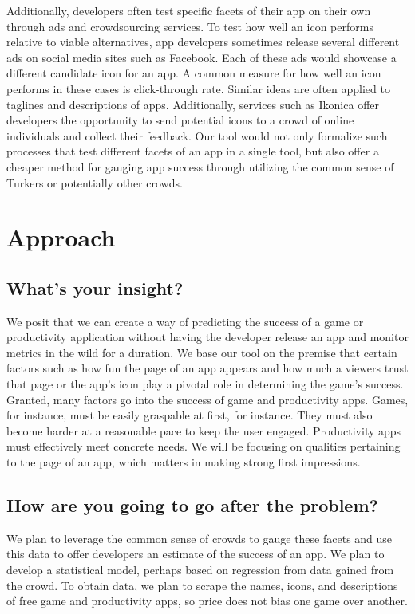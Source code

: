 \documentclass{article}
\begin{document}
Additionally, developers often test specific facets of their app on their own through ads and crowdsourcing services. To test how well an icon performs relative to viable alternatives, app developers sometimes release several different ads on social media sites such as Facebook. Each of these ads would showcase a different candidate icon for an app. A common measure for how well an icon performs in these cases is click-through rate. Similar ideas are often applied to taglines and descriptions of apps. Additionally, services such as Ikonica offer developers the opportunity to send potential icons to a crowd of online individuals and collect their feedback. Our tool would not only formalize such processes that test different facets of an app in a single tool, but also offer a cheaper method for gauging app success through utilizing the common sense of Turkers or potentially other crowds.

\section{Approach}

\subsection{What’s your insight?}

We posit that we can create a way of predicting the success of a game or productivity application without having the developer release an app and monitor metrics in the wild for a duration. We base our tool on the premise that certain factors such as how fun the page of an app appears and how much a viewers trust that page or the app’s icon play a pivotal role in determining the game’s success. \\

Granted, many factors go into the success of game and productivity apps. Games, for instance, must be easily graspable at first, for instance. They must also become harder at a reasonable pace to keep the user engaged. Productivity apps must effectively meet concrete needs. We will be focusing on qualities pertaining to the page of an app, which matters in making strong first impressions.

\subsection{How are you going to go after the problem?}

We plan to leverage the common sense of crowds to gauge these facets and use this data to offer developers an estimate of the success of an app. We plan to develop a statistical model, perhaps based on regression from data gained from the crowd. To obtain data, we plan to scrape the names, icons, and descriptions of free game and productivity apps, so price does not bias one game over another. \\
\end{document}
